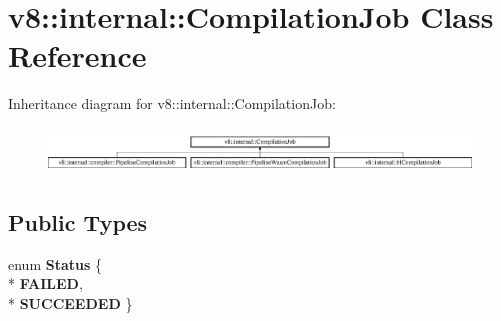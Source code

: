 \hypertarget{classv8_1_1internal_1_1_compilation_job}{}\section{v8\+:\+:internal\+:\+:Compilation\+Job Class Reference}
\label{classv8_1_1internal_1_1_compilation_job}
Inheritance diagram for v8\+:\+:internal\+:\+:Compilation\+Job\+:\begin{figure}[H]
\begin{center}
\leavevmode
\includegraphics[height=1.220044cm]{classv8_1_1internal_1_1_compilation_job}
\end{center}
\end{figure}
\subsection*{Public Types}
\begin{DoxyCompactItemize}
\item 
enum {\bfseries Status} \{ \\*
{\bfseries F\+A\+I\+L\+ED}, 
\\*
{\bfseries S\+U\+C\+C\+E\+E\+D\+ED}
 \}\hypertarget{classv8_1_1internal_1_1_compilation_job_a5139448eb71cada82780ab292fe35e9e}{}\label{classv8_1_1internal_1_1_compilation_job_a5139448eb71cada82780ab292fe35e9e}

\end{DoxyCompactItemize}
